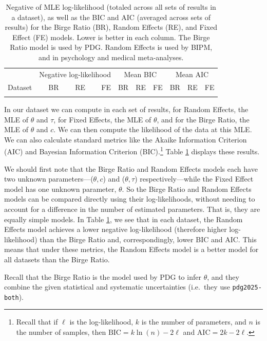 \documentclass[letterpaper,12pt]{article}
\begin{document}
\begin{table}[htbp]
  \centering
  \caption{Negative of MLE log-likelihood (totaled across all sets of results in a dataset), as well as the BIC and AIC (averaged across sets of results) for the Birge Ratio (BR), Random Effects (RE), and Fixed Effect (FE) models. Lower is better in each column. The Birge Ratio model is used by PDG. Random Effects is used by BIPM, and in psychology and medical meta-analyses.}
  \label{tab:noground-loglike}
  \smaller
  \begin{tabular}{l|rrr|rrr|rrr}
  \hline & \multicolumn{3}{c|}{Negative log-likelihood} & \multicolumn{3}{c|}{Mean BIC} & \multicolumn{3}{c}{Mean AIC} \\
  Dataset & BR & RE & FE & BR & RE & FE & BR & RE & FE\\\hline\\\hline
  \end{tabular}
\end{table}

In our dataset we can compute in each set of results, for Random Effects, the MLE of $\theta$ and $\tau$, for Fixed Effects, the MLE of $\theta$, and for the Birge Ratio, the MLE of $\theta$ and $c$. We can then compute the likelihood of the data at this MLE. We can also calculate standard metrics like the Akaike Information Criterion (AIC) and Bayesian Information Criterion (BIC).\footnote{Recall that if $\ell$ is the log-likelihood, $k$ is the number of parameters, and $n$ is the number of samples, then $\mathrm{BIC}=k\ln(n)-2\ell$ and $\mathrm{AIC}=2k-2\ell$.}  Table \ref{tab:noground-loglike} displays these results.

We should first note that the Birge Ratio and Random Effects models each have two unknown parameters---($\theta,c$) and ($\theta,\tau$) respectively---while the Fixed Effect model has one unknown parameter, $\theta$. So the Birge Ratio and Random Effects models can be compared directly using their log-likelihoods, without needing to account for a difference in the number of estimated parameters. That is, they are equally simple models. In Table \ref{tab:noground-loglike}, we see that in each dataset, the Random Effects model achieves a lower negative log-likelihood (therefore higher log-likelihood) than the Birge Ratio and, correspondingly, lower BIC and AIC. This means that under these metrics, the Random Effects model is a better model for all datasets than the Birge Ratio.

Recall that the Birge Ratio is the model used by PDG to infer $\theta$, and they combine the given statistical and systematic uncertainties (i.e.~they use \texttt{pdg2025-both}).
\end{document}
